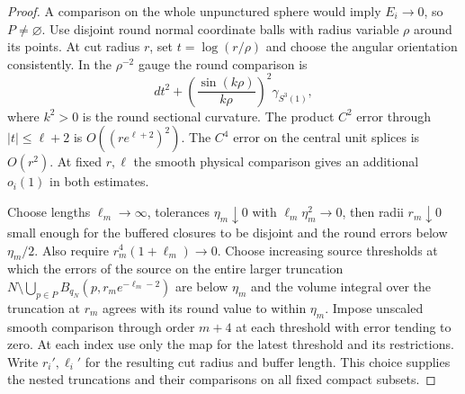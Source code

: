 \begin{proof}
A comparison on the whole unpunctured sphere would imply
\(E_i\to0\), so \(P\ne\varnothing\). Use disjoint round normal
coordinate balls with radius variable \(\rho\) around its points.
At cut radius \(r\), set \(t=\log(r/\rho)\) and choose the angular
orientation consistently. In the \(\rho^{-2}\) gauge the round
comparison is
\[
 dt^2+\left(\frac{\sin(k\rho)}{k\rho}\right)^2\gamma_{S^3(1)},
\]
where \(k^2>0\) is the round sectional curvature. The product
\(C^2\) error through \(|t|\le\ell+2\) is
\(O((r e^{\ell+2})^2)\). The \(C^4\) error on the central unit
splices is \(O(r^2)\). At fixed \(r,\ell\) the smooth physical
comparison gives an additional \(o_i(1)\) in both estimates.

Choose lengths \(\ell_m\to\infty\), tolerances
\(\eta_m\downarrow0\) with \(\ell_m\eta_m^2\to0\), then radii
\(r_m\downarrow0\) small enough for the buffered closures to be
disjoint and the round errors below \(\eta_m/2\). Also require
\(r_m^4(1+\ell_m)\to0\). Choose increasing source thresholds at which
the errors of the source on the entire larger truncation
\(N\setminus\bigcup_{p\in P} B_{q_N}(p,r_m e^{-\ell_m-2})\)
are below \(\eta_m\) and the volume integral over the truncation
at \(r_m\) agrees with its round value to within \(\eta_m\).
Impose unscaled smooth comparison through order \(m+4\) at each
threshold with error tending to zero. At each index use only the
map for the latest threshold and its restrictions. Write
\(r_i',\ell_i'\) for the resulting cut radius and buffer length.
This choice supplies the nested truncations and their comparisons
on all fixed compact subsets.


\end{proof}
